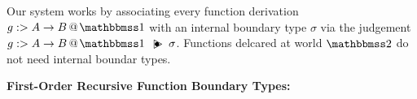 \documentclass[]{article}
\newcommand {\next}{asdlfkj}
\begin{document}
\begin{abstrsyn}
Our system works by associating every function derivation \mbox{$\colfun g {A \to B} \bbone$} with an internal boundary type $\sigma$
via the judgement $\ibtj g {A \to B} \sigma$.  
Functions delcared at world $\bbtwo$ do not need internal boundar types.

\begin{framed}
\noindent\textbf{First-Order Recursive Function Boundary Types:}
\end{framed}








\end{abstrsyn}
\end{document}
